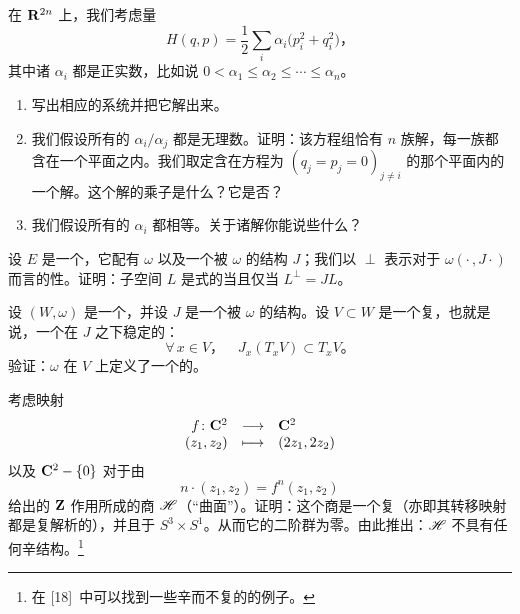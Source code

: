\begin{exercise}[谐振子]\label{ex:ch14-009-harmonic-oscillator}
在\trSymplectic\trManifold{} $\mathbf{R}^{2n}$ 上，我们考虑\trHamiltonian{}量
\[
H(q,p)=\frac{1}{2}\sum_i\alpha_i\bigl(p_i^2+q_i^2\bigr)\text{，}
\]
其中诸 $\alpha_i$ 都是正实数，比如说 $0<\alpha_1\le\alpha_2\le\dotsb\le\alpha_n$。

\begin{enumerate}[label=(\arabic*)]
\item 写出相应的\trHamiltonian{}系统并把它解出来。
\item 我们假设所有的 $\alpha_i/\alpha_j$ 都是无理数。证明：该方程组恰有 $n$ 族\trPeriodic{}解，每一族都含在一个平面之内。我们取定含在方程为 $(q_j=p_j=0)_{j\neq i}$ 的那个平面内的一个解。这个解的\trFloquet{}乘子是什么？它是否\trNondegenerate？
\item 我们假设所有的 $\alpha_i$ 都相等。关于诸\trPeriodic{}解你能说些什么？
\end{enumerate}
\end{exercise}

\begin{exercise}\label{ex:ch14-010-lagrangian-j-orthogonal}
设 $E$ 是一个\trVectorSpace，它配有\trSymplecticForm{} $\omega$ 以及一个被 $\omega$ \trCalibrated{}的\trAlmostComplex{}结构 $J$；我们以 $\perp$ 表示对于\trInnerProduct{} $\omega(\cdot\,,J\cdot)$ 而言的\trOrthogonal{}性。证明：子空间 $L$ 是\trLagrange{}式的当且仅当 $L^\perp=JL$。
\end{exercise}

\begin{exercise}\label{ex:ch14-011-complex-submanifold}
设 $(W,\omega)$ 是一个\trSymplectic\trManifold，并设 $J$ 是一个被 $\omega$ \trCalibrated{}的\trAlmostComplex{}结构。设 $V\subset W$ 是一个复\trSubmanifold，也就是说，一个在 $J$ 之下稳定的\trSubmanifold：
\[
\forall\,x\in V\text{，}\quad J_x(T_xV)\subset T_xV\text{。}
\]
验证：$\omega$ 在 $V$ 上定义了一个\trNondegenerate{}的\trForm。
\end{exercise}

\begin{exercise}[复而不辛]\label{ex:ch14-012-hopf-surface}
考虑映射
\[
\begin{array}{rcl}
f\colon \mathbf{C}^2 & \longrightarrow & \mathbf{C}^2\\
(z_1,z_2) & \longmapsto & (2z_1,2z_2)
\end{array}
\]
以及 $\mathbf{C}^2-\{0\}$ 对于由
\[
n\cdot(z_1,z_2)=f^n(z_1,z_2)
\]
给出的 $\mathbf{Z}$ 作用所成的商 $\mathscr{H}$（“\trHopf{}曲面”）。证明：这个商是一个复\trManifold（亦即其转移映射都是复解析的），并且\trDiffeomorphic{}于 $S^3\times S^1$。从而它的二阶\trRham{}\trCohomology{}群为零。由此推出：$\mathscr{H}$ 不具有任何辛结构。\footnote{在 [18]~中可以找到一些辛而不复的\trManifold{}的例子。}
\end{exercise}

